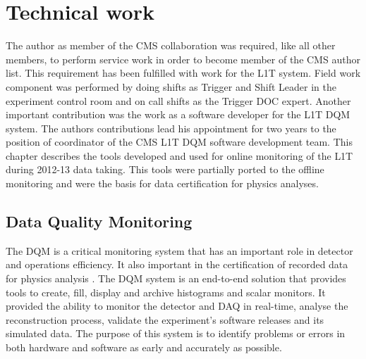 \chapter{Technical work}
\label{CHAPTER:TechnicalWork}

\glsresetall %


The author as member of the \gls{CMS} collaboration was required, like all other members, to perform service work in order to become member of the \gls{CMS} author list. This requirement has been fulfilled with work for the \gls{L1T} system. Field work component was performed by doing shifts as Trigger and Shift Leader in the experiment control room and on call shifts as the Trigger \gls{DOC} expert. Another important contribution was the work as a software developer for the \gls{L1T} \gls{DQM} system. The authors contributions lead his appointment for two years to the position of coordinator of the \gls{CMS} \gls{L1T} \gls{DQM} software development team. This chapter describes the tools developed and used for online monitoring of the \gls{L1T} during 2012-13 data taking. This tools were partially ported to the offline monitoring and were the basis for data certification for physics analyses.

\section{Data Quality Monitoring}
\label{SECTION:TechnicalWork_DataQualityMonitoring}


The \acrfull{DQM} is a critical monitoring system that has an important role in detector and operations efficiency. It also important in the certification of recorded data for physics analysis \cite{CMSTDR:CMSTridasTDRVol1,ARTICLE:CMSDataQualityMonitoringSoftWare_ExperienceAndFuture}. The \gls{DQM} system is an end-to-end solution that provides tools to create, fill, display and archive histograms and scalar monitors. It provided the ability to monitor the detector and \gls{DAQ} in real-time, analyse the reconstruction process, validate the experiment's software releases and its simulated data. The purpose of this system is to identify problems or errors in both hardware and software as early and accurately as possible.

